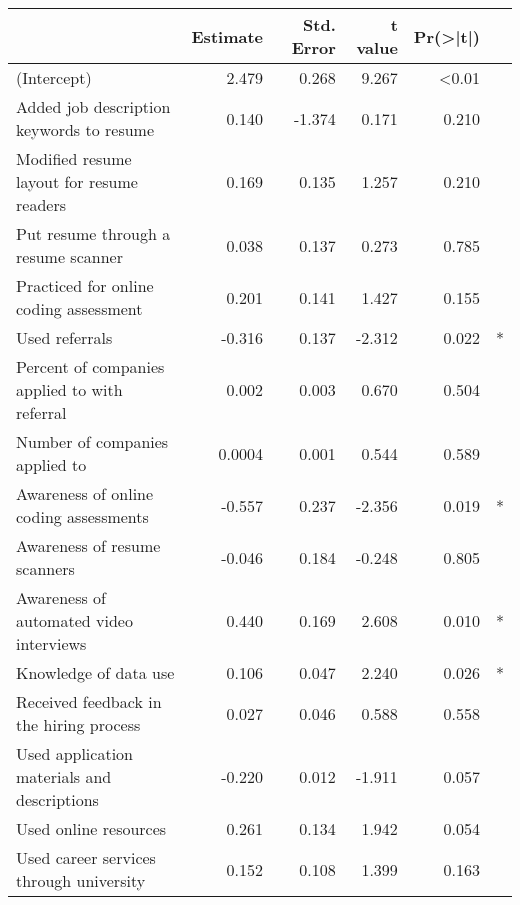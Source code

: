 \begin{table}[ht]
\begin{tabular}{lrrrrl}
\hline
\textbf{}                                            & \textbf{Estimate} & \textbf{Std. Error} & \textbf{t value} & \textbf{Pr(\textgreater{}|t|)} & \textbf{} \\ \hline
(Intercept)                                 & 2.479  & 0.268 & 9.267  & \textless{}0.01 &    \\
Added job description keywords to resume    & 0.140         & -1.374              & 0.171           & 0.210                         &           \\
Modified resume layout for resume readers & 0.169         & 0.135          & 1.257            & 0.210                         &           \\
Put resume through a resume scanner         & 0.038  & 0.137 & 0.273  & 0.785           &    \\
Practiced for online coding assessment      & 0.201  & 0.141 & 1.427  & 0.155           &    \\
Used referrals                              & -0.316 & 0.137 & -2.312 & 0.022           & *  \\
Percent of companies applied to with referral   & 0.002         & 0.003           & 0.670            & 0.504                         &           \\
Number of companies applied to              & 0.0004  & 0.001 & 0.544  & 0.589           &    \\
Awareness of online coding assessments      & -0.557 & 0.237 & -2.356 & 0.019           & *  \\
Awareness of resume scanners                & -0.046 & 0.184 & -0.248 & 0.805           &    \\
Awareness of automated video interviews     & 0.440  & 0.169 & 2.608  & {0.010}           & * \\
Knowledge of data use                       & 0.106  & 0.047 & 2.240  & 0.026           & *  \\
Received feedback in the hiring process     & 0.027  & 0.046 & 0.588  & 0.558           &    \\
Used application materials and descriptions & -0.220 & 0.012 & -1.911 & 0.057           &    \\
Used online resources                       & 0.261  & 0.134 & 1.942  & 0.054           &    \\
Used career services through university     & 0.152  & 0.108 & 1.399  & 0.163           &    \\

\end{tabular}
\end{table}
